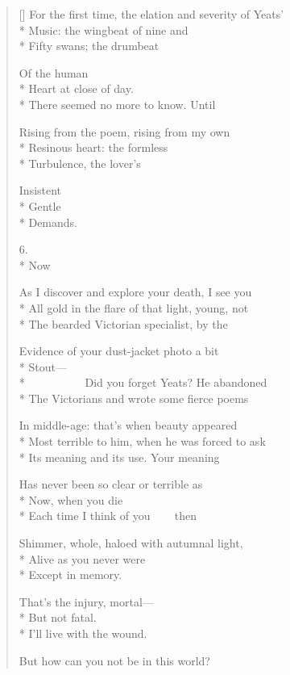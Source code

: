 \begin{verse}[\versewidth]
For the first time, the elation and severity of Yeats'\\*
Music: the wingbeat of nine and\\*
Fifty swans; the drumbeat

Of the human\\*
Heart at close of day.\\*
There seemed no more to know. Until

Rising from the poem, rising from my own\\*
Resinous heart: the formless\\*
Turbulence, the lover's

Insistent\\*
Gentle\\*
Demands.

6.\\*
Now

As I discover and explore your death, I see you\\*
All gold in the flare of that light, young, not\\*
The bearded Victorian specialist, by the

Evidence of your dust-jacket photo a bit\\*
Stout---\\*
            Did you forget Yeats? He abandoned\\*
The Victorians and wrote some fierce poems

In middle-age: that's when beauty appeared\\*
Most terrible to him, when he was forced to ask\\*
Its meaning and its use. Your meaning

Has never been so clear or terrible as\\*
Now, when you die\\*
Each time I think of you     then

Shimmer, whole, haloed with autumnal light,\\*
Alive as you never were\\*
Except in memory.

That's the injury, mortal---\\*
But not fatal.\\*
I'll live with the wound.

But how can you not be in this world?
\end{verse}
